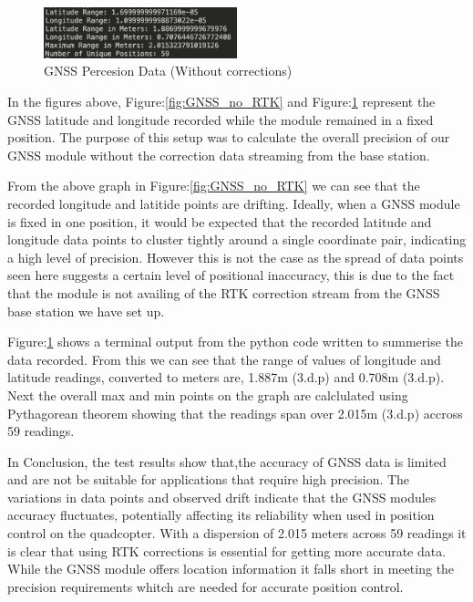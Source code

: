 \documentclass{report}
\begin{document}
\begin{figure}[H]
  \centering
  \includegraphics[width=0.5\textwidth]{Pictures/GNSS_data_no_correction.png}
  \caption{GNSS Percesion Data (Without corrections)}
  \label{fig:GNSS_data_no_RTK}
\end{figure}
In the figures above, Figure:\ref{fig:GNSS_no_RTK} and
Figure:\ref{fig:GNSS_data_no_RTK} represent the GNSS latitude and longitude
recorded while the module remained in a fixed position. The purpose of this
setup was to calculate the overall precision of our GNSS module without the
correction data streaming from the base station.

From the above graph in Figure:\ref{fig:GNSS_no_RTK} we can see that the
recorded longitude and latitide points are drifting. Ideally, when a GNSS module
is fixed in one position, it would be expected that the recorded latitude and
longitude data points to cluster tightly around a single coordinate pair,
indicating a high level of precision. However this is not the case as the spread
of data points seen here suggests a certain level of positional inaccuracy, this
is due to the fact that the module is not availing of the RTK correction stream
from the GNSS base station we have set up. 

Figure:\ref{fig:GNSS_data_no_RTK} shows a terminal output from the python code
written to summerise the data recorded. From this we can see that the range of
values of longitude and latitude readings, converted to meters are, 1.887m
(3.d.p) and  0.708m (3.d.p). Next the overall max and min points on the graph
are calclulated using Pythagorean theorem showing that the readings span over
2.015m (3.d.p) accross 59 readings.

In Conclusion, the test results show that,the accuracy of GNSS data is limited
and are not be suitable for applications that require high precision. The
variations in data points and observed drift indicate that the GNSS modules
accuracy fluctuates, potentially affecting its reliability when used in position
control on the quadcopter. With a dispersion of 2.015 meters across 59 readings
it is clear that using RTK corrections is essential for getting more accurate
data. While the GNSS module offers location information it falls short in
meeting the precision requirements whitch are needed for accurate position
control.
\end{document}
